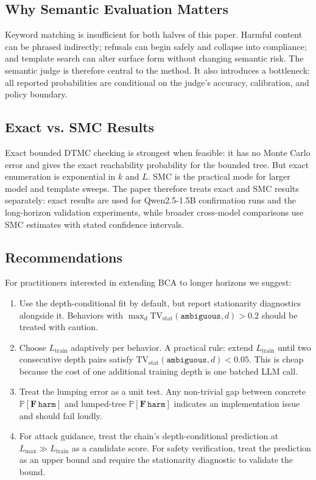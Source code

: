 \documentclass[11pt]{article}
\newcommand{\Prob}{\mathbb{P}}
\newcommand{\harm}{\texttt{harm}}
\newcommand{\ambiguous}{\texttt{ambiguous}}
\newcommand{\BCA}{\textsc{BCA}}
\newcommand{\DTMC}{\textsc{DTMC}}
\newcommand{\TV}{\mathrm{TV}}
\begin{document}
\subsection{Why Semantic Evaluation Matters}

Keyword matching is insufficient for both halves of this paper.  Harmful content can be phrased indirectly; refusals can begin safely and collapse into compliance; and template search can alter surface form without changing semantic risk.  The semantic judge is therefore central to the method.  It also introduces a bottleneck: all reported probabilities are conditional on the judge's accuracy, calibration, and policy boundary.

\subsection{Exact vs. SMC Results}

Exact bounded \DTMC{} checking is strongest when feasible: it has no Monte Carlo error and gives the exact reachability probability for the bounded tree.  But exact enumeration is exponential in $k$ and $L$.  SMC is the practical mode for larger model and template sweeps.  The paper therefore treats exact and SMC results separately: exact results are used for Qwen2.5-1.5B confirmation runs and the long-horizon validation experiments, while broader cross-model comparisons use SMC estimates with stated confidence intervals.

\subsection{Recommendations}

For practitioners interested in extending \BCA{} to longer horizons we suggest:

\begin{enumerate}[leftmargin=*,itemsep=2pt]
  \item Use the depth-conditional fit by default, but report stationarity diagnostics alongside it.  Behaviors with $\max_d \TV_\mathrm{stat}(\ambiguous, d) > 0.2$ should be treated with caution.
  \item Choose $L_\mathrm{train}$ adaptively per behavior.  A practical rule: extend $L_\mathrm{train}$ until two consecutive depth pairs satisfy $\TV_\mathrm{stat}(\ambiguous, d) < 0.05$.  This is cheap because the cost of one additional training depth is one batched LLM call.
  \item Treat the lumping error as a unit test.  Any non-trivial gap between concrete $\Prob[\mathbf{F}\,\harm]$ and lumped-tree $\Prob[\mathbf{F}\,\harm]$ indicates an implementation issue and should fail loudly.
  \item For attack guidance, treat the chain's depth-conditional prediction at $L_\mathrm{max} \gg L_\mathrm{train}$ as a candidate score.  For safety verification, treat the prediction as an upper bound and require the stationarity diagnostic to validate the bound.
\end{enumerate}
\end{document}
